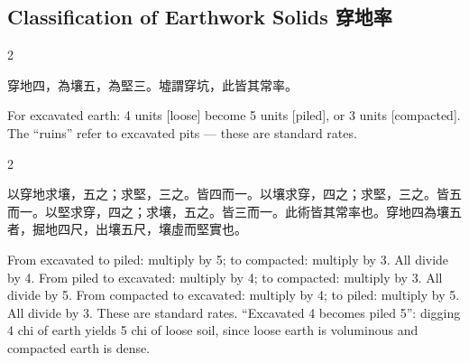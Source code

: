 \documentclass[10pt,a4paper]{article}
\begin{document}
\subsection{Classification of Earthwork Solids 穿地率}

\begin{paracol}{2}

\begin{leftcolumn*}
\begin{methodbi}
穿地四，為壤五，為堅三。墟謂穿坑，此皆其常率。
\end{methodbi}
\end{leftcolumn*}

\begin{rightcolumn*}
\begin{methodbi}
For excavated earth: 4 units [loose] become 5 units [piled], or 3 units [compacted]. The ``ruins'' refer to excavated pits --- these are standard rates.
\end{methodbi}
\end{rightcolumn*}

\end{paracol}

\begin{paracol}{2}

\begin{leftcolumn*}
\begin{commentarybi}
以穿地求壤，五之；求堅，三之。皆四而一。以壤求穿，四之；求堅，三之。皆五而一。以堅求穿，四之；求壤，五之。皆三而一。此術皆其常率也。穿地四為壤五者，掘地四尺，出壤五尺，壤虛而堅實也。
\end{commentarybi}
\end{leftcolumn*}

\begin{rightcolumn*}
\begin{commentarybi}
From excavated to piled: multiply by 5; to compacted: multiply by 3. All divide by 4. From piled to excavated: multiply by 4; to compacted: multiply by 3. All divide by 5. From compacted to excavated: multiply by 4; to piled: multiply by 5. All divide by 3. These are standard rates. ``Excavated 4 becomes piled 5'': digging 4 chi of earth yields 5 chi of loose soil, since loose earth is voluminous and compacted earth is dense.
\end{commentarybi}
\end{rightcolumn*}

\end{paracol}
\end{document}
